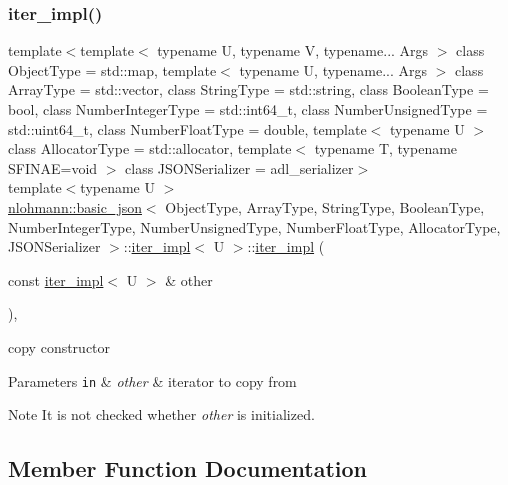 \subsubsection{\texorpdfstring{iter\+\_\+impl()}{iter\_impl()}\hspace{0.1cm}{\footnotesize\ttfamily [3/3]}}
{\footnotesize\ttfamily template$<$template$<$ typename U, typename V, typename... Args $>$ class Object\+Type = std\+::map, template$<$ typename U, typename... Args $>$ class Array\+Type = std\+::vector, class String\+Type  = std\+::string, class Boolean\+Type  = bool, class Number\+Integer\+Type  = std\+::int64\+\_\+t, class Number\+Unsigned\+Type  = std\+::uint64\+\_\+t, class Number\+Float\+Type  = double, template$<$ typename U $>$ class Allocator\+Type = std\+::allocator, template$<$ typename T, typename S\+F\+I\+N\+A\+E=void $>$ class J\+S\+O\+N\+Serializer = adl\+\_\+serializer$>$ \\
template$<$typename U $>$ \\
\hyperlink{classnlohmann_1_1basic__json}{nlohmann\+::basic\+\_\+json}$<$ Object\+Type, Array\+Type, String\+Type, Boolean\+Type, Number\+Integer\+Type, Number\+Unsigned\+Type, Number\+Float\+Type, Allocator\+Type, J\+S\+O\+N\+Serializer $>$\+::\hyperlink{classnlohmann_1_1basic__json_1_1iter__impl}{iter\+\_\+impl}$<$ U $>$\+::\hyperlink{classnlohmann_1_1basic__json_1_1iter__impl}{iter\+\_\+impl} (\begin{DoxyParamCaption}\item[{const \hyperlink{classnlohmann_1_1basic__json_1_1iter__impl}{iter\+\_\+impl}$<$ U $>$ \&}]{other }\end{DoxyParamCaption})\hspace{0.3cm}{\ttfamily [inline]}, {\ttfamily [noexcept]}}



copy constructor 


\begin{DoxyParams}[1]{Parameters}
\mbox{\tt in}  & {\em other} & iterator to copy from \\
\hline
\end{DoxyParams}
\begin{DoxyNote}{Note}
It is not checked whether {\itshape other} is initialized. 
\end{DoxyNote}


\subsection{Member Function Documentation}
\mbox{\label{classnlohmann_1_1basic__json_1_1iter__impl_a030a45b63b70e12b18ad4f6c1c4f1239}} 
